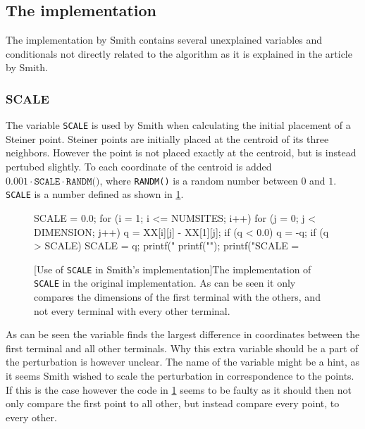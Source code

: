 \subsection{The implementation}
\label{sec:implementation}

The implementation by Smith contains several unexplained variables and conditionals not
directly related to the algorithm as it is explained in the article by Smith.

\subsubsection{SCALE}
\label{sec:scale}

The variable \texttt{SCALE} is used by Smith when calculating the initial
placement of a Steiner point. Steiner points are initially placed at the
centroid of its three neighbors. However the point is not placed exactly at the
centroid, but is instead pertubed slightly. To each coordinate of the centroid
is added $0.001 \cdot \texttt{SCALE} \cdot \texttt{RANDM()}$, where \texttt{RANDM()} is a
random number between $0$ and $1$. \texttt{SCALE} is a number defined as shown
in \cref{fig:randm}.

\begin{figure}[htbp]
\begin{c-code}
SCALE = 0.0;
for (i = 1; i <= NUMSITES; i++) {
  for (j = 0; j < DIMENSION; j++) {
    q = XX[i][j] - XX[1][j];
    if (q < 0.0) q = -q;
    if (q > SCALE) SCALE = q;
    printf(" %
  }
  printf("\n");
}
printf("SCALE = %
\end{c-code}
  [Use of \texttt{SCALE} in Smith's implementation]{The implementation
    of \texttt{SCALE} in the original implementation. As can be seen it only
    compares the dimensions of the first terminal with the others, and not every
    terminal with every other terminal.\label{fig:randm}}
\end{figure}

As can be seen the variable finds the largest difference in coordinates between the first
terminal and all other terminals. Why this extra variable should be a part of
the perturbation is however unclear. The name of the variable might be a hint,
as it seems Smith wished to scale the perturbation in correspondence to the
points. If this is the case however the code in \cref{fig:randm} seems to be
faulty as it should then not only compare the first point to all other, but
instead compare every point, to every other.

